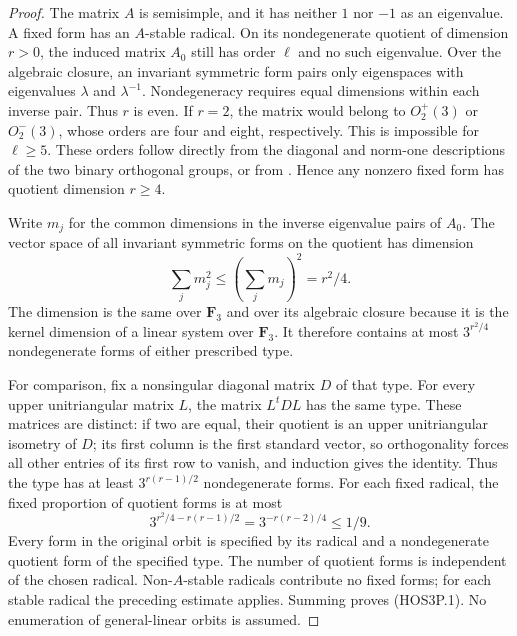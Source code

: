 \begin{proof}
The matrix $A$ is semisimple, and it has neither $1$ nor $-1$ as
an eigenvalue. A fixed form has an $A$-stable radical. On its
nondegenerate quotient of dimension $r>0$, the induced matrix
$A_0$ still has order $\ell$ and no such eigenvalue. Over the
algebraic closure, an invariant symmetric form pairs only
eigenspaces with eigenvalues $\lambda$ and $\lambda^{-1}$.
Nondegeneracy requires equal dimensions within each inverse pair.
Thus $r$ is even. If $r=2$, the matrix would belong to
$O_2^+(3)$ or $O_2^-(3)$, whose orders are four and eight,
respectively. This is impossible for $\ell\ge5$. These orders
follow directly from the diagonal and norm-one descriptions of
the two binary orthogonal groups, or from
\cite[Theorem~11.4 and its proof, pp.~139--140]{HOS:Taylor1992}.
Hence any nonzero fixed form has quotient dimension $r\ge4$.

Write $m_j$ for the common dimensions in the inverse eigenvalue
pairs of $A_0$. The vector space of all invariant symmetric forms
on the quotient has dimension
\[
                \sum_jm_j^2\le\left(\sum_jm_j\right)^2
                         =r^2/4.                            \tag{HOS3P.2}
\]
The dimension is the same over $\mathbf F_3$ and over its
algebraic closure because it is the kernel dimension of a linear
system over $\mathbf F_3$. It therefore contains at most
$3^{r^2/4}$ nondegenerate forms of either prescribed type.

For comparison, fix a nonsingular diagonal matrix $D$ of that
type. For every upper unitriangular matrix $L$, the matrix
$L^tDL$ has the same type. These matrices are distinct: if two
are equal, their quotient is an upper unitriangular isometry of
$D$; its first column is the first standard vector, so
orthogonality forces all other entries of its first row to vanish,
and induction gives the identity. Thus the type has at least
$3^{r(r-1)/2}$ nondegenerate forms. For each fixed radical,
the fixed proportion of quotient forms is at most
\[
             3^{r^2/4-r(r-1)/2}
                =3^{-r(r-2)/4}\le1/9.                       \tag{HOS3P.3}
\]
Every form in the original orbit is specified by its radical
and a nondegenerate quotient form of the specified type. The
number of quotient forms is independent of the chosen radical.
Non-$A$-stable radicals contribute no fixed forms; for each
stable radical the preceding estimate applies. Summing proves
(HOS3P.1). No enumeration of general-linear orbits is assumed.
\end{proof}

